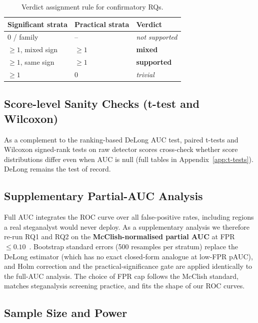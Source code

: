 \documentclass[10pt,twocolumn,a4paper]{article}
\begin{document}
\begin{table}[!htbp]
\centering\small
\caption{Verdict assignment rule for confirmatory RQs.}
\label{tab:verdictrule}
\setlength{\tabcolsep}{6pt}\renewcommand{\arraystretch}{1.1}
\begin{tabular}{@{}lll@{}}
\toprule
\textbf{Significant strata} & \textbf{Practical strata} & \textbf{Verdict} \\
\midrule
0 / family            & --             & \emph{not supported} \\
$\geq\!1$, mixed sign & $\geq\!1$      & \textbf{mixed}       \\
$\geq\!1$, same sign  & $\geq\!1$      & \textbf{supported}   \\
$\geq\!1$             & 0              & \emph{trivial}       \\
\bottomrule
\end{tabular}
\end{table}

\subsection{Score-level Sanity Checks (t-test and Wilcoxon)}
\label{sec:scorelevel}
As a complement to the ranking-based DeLong AUC test, paired t-tests and Wilcoxon signed-rank tests on raw detector scores cross-check whether score distributions differ even when AUC is null (full tables in Appendix~\ref{app:t-tests}). DeLong remains the test of record.

\subsection{Supplementary Partial-AUC Analysis}
\label{sec:pauc}

Full AUC integrates the ROC curve over all false-positive rates, including regions a real steganalyst would never deploy. As a supplementary analysis we therefore re-run RQ1 and RQ2 on the \textbf{McClish-normalised partial AUC} at FPR\,$\leq\!0.10$~\cite{mcclish1989}. Bootstrap standard errors (500 resamples per stratum) replace the DeLong estimator (which has no exact closed-form analogue at low-FPR pAUC), and Holm correction and the practical-significance gate are applied identically to the full-AUC analysis. The choice of FPR cap follows the McClish standard, matches steganalysis screening practice, and fits the shape of our ROC curves.

\subsection{Sample Size and Power}
\end{document}
